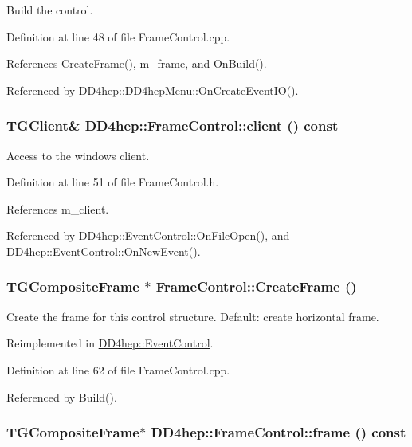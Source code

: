 Build the control. 

Definition at line 48 of file FrameControl.cpp.

References CreateFrame(), m\_\-frame, and OnBuild().

Referenced by DD4hep::DD4hepMenu::OnCreateEventIO().\hypertarget{class_d_d4hep_1_1_frame_control_a3346070b9e66719ae771c541adb196fd}{
\subsubsection[{client}]{\setlength{\rightskip}{0pt plus 5cm}TGClient\& DD4hep::FrameControl::client () const}}
\label{class_d_d4hep_1_1_frame_control_a3346070b9e66719ae771c541adb196fd}


Access to the windows client. 

Definition at line 51 of file FrameControl.h.

References m\_\-client.

Referenced by DD4hep::EventControl::OnFileOpen(), and DD4hep::EventControl::OnNewEvent().\hypertarget{class_d_d4hep_1_1_frame_control_a3622593e0da13ddc3719d845782ec7be}{
\subsubsection[{CreateFrame}]{\setlength{\rightskip}{0pt plus 5cm}TGCompositeFrame $\ast$ FrameControl::CreateFrame ()}}
\label{class_d_d4hep_1_1_frame_control_a3622593e0da13ddc3719d845782ec7be}


Create the frame for this control structure. Default: create horizontal frame. 

Reimplemented in \hyperlink{class_d_d4hep_1_1_event_control_a10479ca8f5f5836f6e3a9c1367eea1fb}{DD4hep::EventControl}.

Definition at line 62 of file FrameControl.cpp.

Referenced by Build().\hypertarget{class_d_d4hep_1_1_frame_control_a7f27f01bc5c08e339639d2d005e7f790}{
\subsubsection[{frame}]{\setlength{\rightskip}{0pt plus 5cm}TGCompositeFrame$\ast$ DD4hep::FrameControl::frame () const}}
\label{class_d_d4hep_1_1_frame_control_a7f27f01bc5c08e339639d2d005e7f790}


